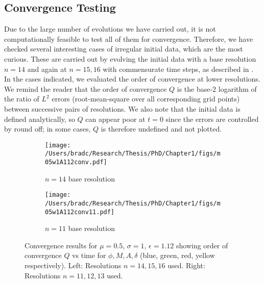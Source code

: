 \documentclass[../PhD.tex]{subfiles}
\begin{document}
\begin{subappendices}
\section{Convergence Testing}
\label{a:convergence}

Due to the large number of evolutions we have carried out, it is not
computationally feasible to test all of them for convergence.  Therefore,
we have checked several interesting cases of irregular initial data, which 
are the most curious.  These are carried out by evolving the initial data
with a base resolution $n=14$ and again at $n=15,16$ with commensurate
time steps, as described in \cite{1508.02709}.  In the cases indicated, we
evaluated the order of convergence at lower resolutions.  We remind the
reader that the order of convergence $Q$ is the base-2 logarithm of the ratio
of $L^2$ errors (root-mean-square over all corresponding grid points) between
successive pairs of resolutions.  We also note that the initial data is 
defined analytically, so $Q$ can appear poor at $t=0$ since the errors are
controlled by round off; in some cases, $Q$ is therefore undefined and 
not plotted.

\begin{figure}[!t]
\centering
\begin{subfigure}[t]{0.47\textwidth}
\texttt{[image: /Users/bradc/Research/Thesis/PhD/Chapter1/figs/m05w1A112conv.pdf]}
\caption{$n=14$ base resolution}
\label{f:m05w1e112conv}
\end{subfigure}
\begin{subfigure}[t]{0.47\textwidth}
\texttt{[image: /Users/bradc/Research/Thesis/PhD/Chapter1/figs/m05w1A112conv11.pdf]}
\caption{$n=11$ base resolution}
\label{f:m05w1e112conv11}
\end{subfigure}
\caption[Comparison of order of convergence of $\phi$, $M$, $A$, $\delta$ as a function of time for $\mu = 0.5$ over two base resolutions]{Convergence results for $\mu=0.5$, $\sigma=1$, $\epsilon=1.12$
showing order of convergence $Q$ vs time for $\phi,M,A,\delta$ 
(blue, green, red, yellow respectively). Left: Resolutions $n=14,15,16$ used.
Right: Resolutions $n=11,12,13$ used.}
\label{f:m05w1convergence}
\end{figure}



\end{subappendices}
\end{document}
